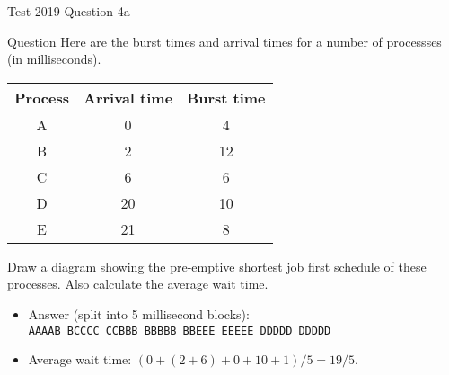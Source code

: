 \documentclass[notes]{beamer}
\begin{document}
\begin{frame}{Test 2019 Question 4a}
    \begin{alertblock}{Question}
        Here are the burst times and arrival times for a number of processses (in milliseconds).
        \begin{table}
            \centering
            \begin{tabular}{c|c|c}
                \hline
                Process & Arrival time & Burst time \\ \hline
                A       & 0            & 4          \\ \hline
                B       & 2            & 12         \\ \hline
                C       & 6            & 6          \\ \hline
                D       & 20           & 10         \\ \hline
                E       & 21           & 8          \\ \hline
            \end{tabular}
        \end{table}
        Draw a diagram showing the pre-emptive shortest job first schedule of these processes. Also calculate the average wait time.
    \end{alertblock}
    \pause
    \begin{itemize}
        \item Answer (split into 5 millisecond blocks):\\ \texttt{AAAAB BCCCC CCBBB BBBBB BBEEE EEEEE DDDDD DDDDD}
        \item Average wait time: $(0 + (2 + 6) + 0 + 10 + 1) / 5 = 19 / 5$.
    \end{itemize}
\end{frame}
\end{document}
